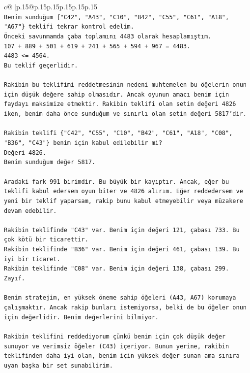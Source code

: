 \documentclass{article}
\begin{document}
{\begin{supertabular}{c@{$\;$}|p{.15\linewidth}@{}p{.15\linewidth}p{.15\linewidth}p{.15\linewidth}p{.15\linewidth}p{.15\linewidth}}
{{{\\ 
\texttt{Benim sunduğum \{"C42", "A43", "C10", "B42", "C55", "C61", "A18", "A67"\} teklifi tekrar kontrol edelim.} \\
\texttt{Önceki savunmamda çaba toplamını 4483 olarak hesaplamıştım.} \\
\texttt{107 + 889 + 501 + 619 + 241 + 565 + 594 + 967 = 4483.} \\
\texttt{4483 <= 4564.} \\
\texttt{Bu teklif geçerlidir.} \\
\\ 
\texttt{Rakibin bu teklifimi reddetmesinin nedeni muhtemelen bu öğelerin onun için düşük değere sahip olmasıdır. Ancak oyunun amacı benim için faydayı maksimize etmektir. Rakibin teklifi olan setin değeri 4826 iken, benim daha önce sunduğum ve sınırlı olan setin değeri 5817'dir.} \\
\\ 
\texttt{Rakibin teklifi \{"C42", "C55", "C10", "B42", "C61", "A18", "C08", "B36", "C43"\} benim için kabul edilebilir mi?} \\
\texttt{Değeri 4826.} \\
\texttt{Benim sunduğum değer 5817.} \\
\\ 
\texttt{Aradaki fark 991 birimdir. Bu büyük bir kayıptır. Ancak, eğer bu teklifi kabul edersem oyun biter ve 4826 alırım. Eğer reddedersem ve yeni bir teklif yaparsam, rakip bunu kabul etmeyebilir veya müzakere devam edebilir.} \\
\\ 
\texttt{Rakibin teklifinde "C43" var. Benim için değeri 121, çabası 733. Bu çok kötü bir ticarettir.} \\
\texttt{Rakibin teklifinde "B36" var. Benim için değeri 461, çabası 139. Bu iyi bir ticaret.} \\
\texttt{Rakibin teklifinde "C08" var. Benim için değeri 138, çabası 299. Zayıf.} \\
\\ 
\texttt{Benim stratejim, en yüksek öneme sahip öğeleri (A43, A67) korumaya çalışmaktır. Ancak rakip bunları istemiyorsa, belki de bu öğeler onun için değerlidir. Benim değerlerini bilmiyor.} \\
\\ 
\texttt{Rakibin teklifini reddediyorum çünkü benim için çok düşük değer sunuyor ve verimsiz öğeler (C43) içeriyor. Bunun yerine, rakibin teklifinden daha iyi olan, benim için yüksek değer sunan ama sınıra uyan başka bir set sunabilirim.} \\
}}}
\end{supertabular}}
\end{document}
